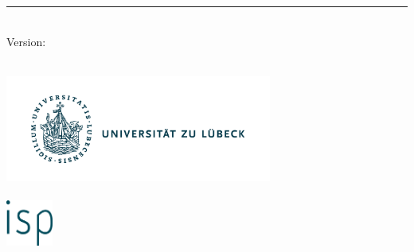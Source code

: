 %
\begin{titlepage}
    \flushright
    \hfill
    \vfill
    {\LARGE\thesisTitle \par}
    \rule[5pt]{\textwidth}{.4pt} \par
    {\Large\thesisName}
    \vfill
    \textit{\large\thesisDate} \\
    Version: \thesisVersion
\end{titlepage}


\begin{titlepage}
    \tgherosfont
    \centering

    {\Large \thesisUniversity} \\[4mm]
    \includegraphics[height=3.5cm]{gfx/Logo_Uni_Luebeck}\\[3mm]
    \textsf{\thesisUniversityInstitute} \\[4mm]
    \includegraphics[height=1.5cm]{gfx/Logo_isp} \\[1mm]

    \vfill
    {\large \thesisSubject} \\[5mm]
    {\LARGE \color{ctcolortitle}\textbf{\thesisTitle} \\[10mm]}
    {\Large \thesisName} \\


\end{titlepage}
